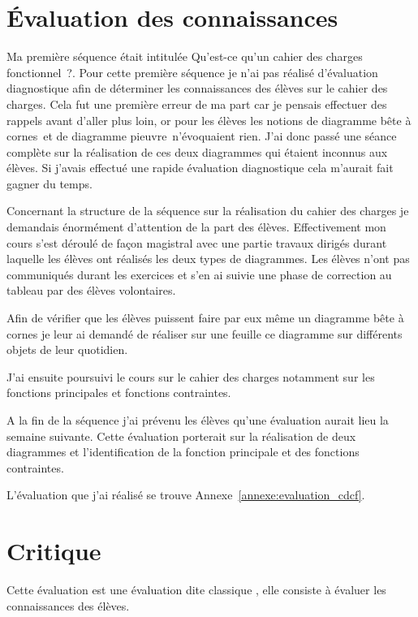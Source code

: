 
\section{Évaluation des connaissances}

Ma première séquence était intitulée \og Qu'est-ce qu'un cahier des charges fonctionnel~?\fg. 
Pour cette première séquence je n'ai pas réalisé d'évaluation diagnostique afin de déterminer les connaissances des élèves sur le cahier des charges.
Cela fut une première erreur de ma part car je pensais effectuer des rappels avant d'aller plus loin, or pour les élèves les notions de \og diagramme bête à cornes\fg ~et de \og diagramme pieuvre\fg ~n'évoquaient rien. J'ai donc passé une séance complète sur la réalisation de ces deux diagrammes qui étaient inconnus aux élèves.
Si j'avais effectué une rapide évaluation diagnostique cela m'aurait fait gagner du temps.

Concernant la structure de la séquence sur la réalisation du cahier des charges je demandais énormément d'attention de la part des élèves.
Effectivement mon cours s'est déroulé de façon magistral avec une partie travaux dirigés durant laquelle les élèves ont réalisés les deux types de diagrammes.
Les élèves n'ont pas communiqués durant les exercices et s'en ai suivie une phase de correction au tableau par des élèves volontaires.

Afin de vérifier que les élèves puissent faire par eux même un diagramme bête à cornes je leur ai demandé de réaliser sur une feuille ce diagramme sur différents objets de leur quotidien.

J'ai ensuite poursuivi le cours sur le cahier des charges notamment sur les fonctions principales et fonctions contraintes.

A la fin de la séquence j'ai prévenu les élèves qu'une évaluation aurait lieu la semaine suivante. Cette évaluation porterait sur la réalisation de deux diagrammes et l'identification de la fonction principale et des fonctions contraintes.

L'évaluation que j'ai réalisé se trouve Annexe~\ref{annexe:evaluation_cdcf}.

\section{Critique}

Cette évaluation est une évaluation dite \og classique \fg, elle consiste à évaluer les connaissances des élèves.

